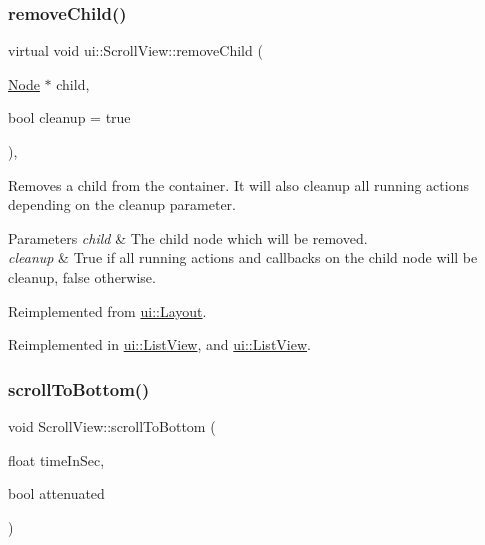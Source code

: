 \subsubsection{\texorpdfstring{remove\+Child()}{removeChild()}\hspace{0.1cm}{\footnotesize\ttfamily [2/2]}}
{\footnotesize\ttfamily virtual void ui\+::\+Scroll\+View\+::remove\+Child (\begin{DoxyParamCaption}\item[{\hyperlink{classNode}{Node} $\ast$}]{child,  }\item[{bool}]{cleanup = {\ttfamily true} }\end{DoxyParamCaption})\hspace{0.3cm}{\ttfamily [override]}, {\ttfamily [virtual]}}

Removes a child from the container. It will also cleanup all running actions depending on the cleanup parameter.


\begin{DoxyParams}{Parameters}
{\em child} & The child node which will be removed. \\
\hline
{\em cleanup} & True if all running actions and callbacks on the child node will be cleanup, false otherwise. \\
\hline
\end{DoxyParams}


Reimplemented from \hyperlink{classui_1_1Layout_a13d675c669b6b926956baf484ce0857a}{ui\+::\+Layout}.



Reimplemented in \hyperlink{classui_1_1ListView_ace4890246e03a8de66cfe9d0312df365}{ui\+::\+List\+View}, and \hyperlink{classui_1_1ListView_a7002fe4ad783aeccf56cebbe4144036e}{ui\+::\+List\+View}.

\mbox{\label{classui_1_1ScrollView_aaadf1e2477086b137b845f88e72abce3}} 
\subsubsection{\texorpdfstring{scroll\+To\+Bottom()}{scrollToBottom()}\hspace{0.1cm}{\footnotesize\ttfamily [1/2]}}
{\footnotesize\ttfamily void Scroll\+View\+::scroll\+To\+Bottom (\begin{DoxyParamCaption}\item[{float}]{time\+In\+Sec,  }\item[{bool}]{attenuated }\end{DoxyParamCaption})\hspace{0.3cm}{\ttfamily [virtual]}}

